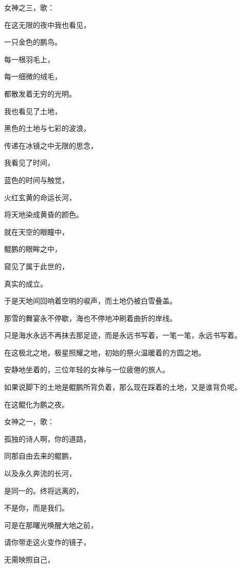 \documentclass[UTF8]{article}
\begin{document}
\par 女神之三，歌：
\\[0.6cm]
\par 在这无限的夜中我也看见，
\par 一只金色的鹏鸟。
\par 每一根羽毛上，
\par 每一细微的绒毛，
\par 都散发着无穷的光明。
\par 我也看见了土地，
\par 黑色的土地与七彩的波浪，
\par 传递在冰镜之中无限的思念，
\par 我看见了时间，
\par 蓝色的时间与触觉，
\par 火红玄黄的命运长河，
\par 将天地染成黄昏的颜色。
\par 就在天空的眼瞳中，
\par 鲲鹏的眼眸之中，
\par 窥见了属于此世的，
\par 真实的成立。
\\[0.6cm]
\par 于是天地间回响着空明的唳声，而土地仍被白雪叠盖。
\par 那雪的舞宴永不停歇，海也不停地冲刷着曲折的岸线。
\par 只是海水永远不再抹去那足迹，而是永远书写着，一笔一笔，永远书写着。
\\[0.6cm]
\par 在这极北之地，极星照耀之地，初始的祭火温暖着的方圆之地。
\par 安静地坐着的，三位年轻的女神与一位疲倦的旅人。
\par 如果说脚下的土地是鲲鹏所背负着，那么现在踩着的土地，又是谁背负呢。
\par 在这鲲化为鹏之夜。
\\[0.6cm]
\par 女神之一，歌：
\\[0.6cm]
\par 孤独的诗人啊，你的道路，
\par 同那自由去来的鲲鹏，
\par 以及永久奔流的长河，
\par 是同一的。终将远离的，
\par 不是你，而是我们。
\par 可是在那曙光唤醒大地之前，
\par 请你带走这火变作的镜子，
\par 无需映照自己，
\end{document}

